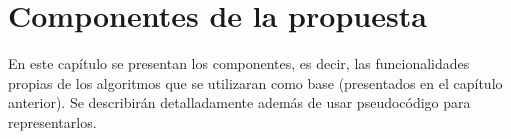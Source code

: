 \chapter{Componentes de la propuesta}

En este capítulo se presentan los componentes, es decir, las funcionalidades propias de los algoritmos que se utilizaran como base (presentados en el capítulo anterior). 
Se describirán detalladamente además de usar pseudocódigo para representarlos.



